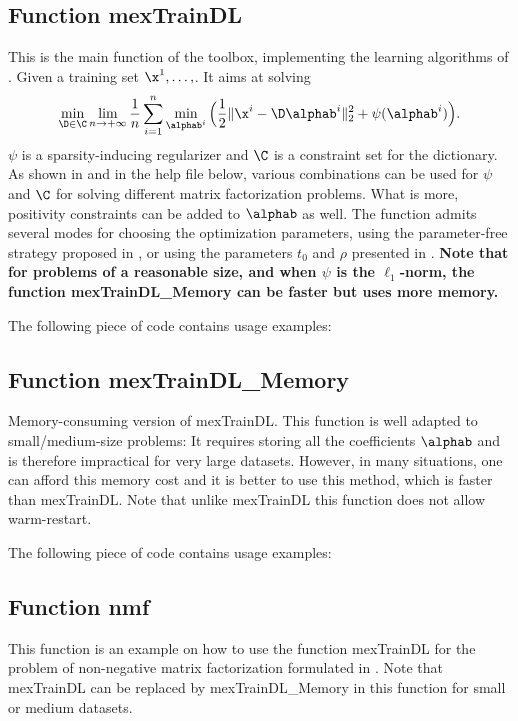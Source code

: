 \documentclass[a4paper, 11pt]{article}
\begin{document}
\subsection{Function mexTrainDL}
This is the main function of the toolbox, implementing the learning algorithms of \cite{mairal9}. 
Given a training set $\x^1,\ldots,  $. It aims at solving
\begin{equation}
\min_{\D \in \C} \lim_{n \to +\infty} \frac{1}{n} \sum_{i=1}^n \min_{\alphab^i} \Big( \frac{1}{2} \|\x^i-\D\alphab^i\|_2^2 + \psi(\alphab^i)\Big).
\end{equation}
$\psi$ is a sparsity-inducing regularizer and $\C$ is a constraint set for the dictionary. As shown in \cite{mairal9} 
and in the help file below, various combinations can be used for $\psi$ and $\C$ for solving different matrix factorization problems.
What is more, positivity constraints can be added to $\alphab$ as well. The function admits several modes for choosing the optimization parameters, using the parameter-free strategy proposed in \cite{mairal7}, or using the parameters $t_0$ and $\rho$ presented
in \cite{mairal9}. {\bf Note that for problems of a reasonable size, and when $\psi$ is the $\ell_1$-norm, 
   the function mexTrainDL\_Memory can be faster but uses more memory.} 



The following piece of code contains usage examples:



\subsection{Function mexTrainDL\_Memory}
Memory-consuming version of mexTrainDL. This function is well adapted to small/medium-size problems:
It requires storing all the coefficients $\alphab$ and is therefore impractical
for very large datasets. However, in many situations, one can afford this memory cost and it is better to use this method, which 
is faster than mexTrainDL.
Note that unlike mexTrainDL this function does not allow warm-restart.
%    

The following piece of code contains usage examples:


\subsection{Function nmf}
This function is an example on how to use the function mexTrainDL for the
problem of non-negative matrix factorization formulated in \cite{lee2}.  Note
that mexTrainDL can be replaced by mexTrainDL\_Memory in this function for
small or medium datasets.
\end{document}
